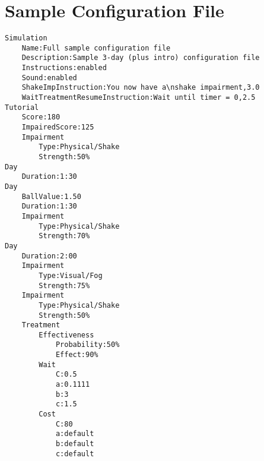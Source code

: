 \documentclass{article}
\begin{document}

 
%    
    
\pagebreak\section*{Sample Configuration File}
\begin{lstlisting}
Simulation
    Name:Full sample configuration file
    Description:Sample 3-day (plus intro) configuration file  
    Instructions:enabled
    Sound:enabled
    ShakeImpInstruction:You now have a\nshake impairment,3.0
    WaitTreatmentResumeInstruction:Wait until timer = 0,2.5
Tutorial
    Score:180
    ImpairedScore:125
    Impairment
        Type:Physical/Shake
        Strength:50%
Day
    Duration:1:30
Day
    BallValue:1.50
    Duration:1:30
    Impairment
        Type:Physical/Shake
        Strength:70%
Day
    Duration:2:00
    Impairment
        Type:Visual/Fog
        Strength:75%
    Impairment
        Type:Physical/Shake
        Strength:50%
    Treatment
        Effectiveness
            Probability:50%
            Effect:90%
        Wait
            C:0.5
            a:0.1111
            b:3
            c:1.5
        Cost
            C:80
            a:default
            b:default
            c:default
\end{lstlisting}    
\end{document}

